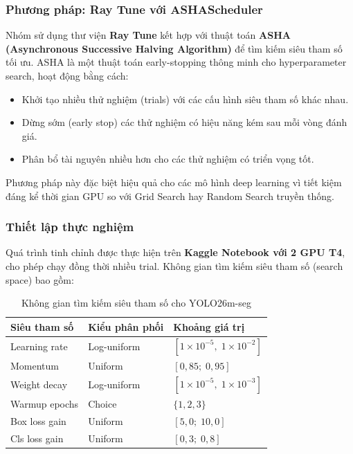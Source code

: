 \subsubsection{Phương pháp: Ray Tune với ASHAScheduler}

Nhóm sử dụng thư viện \textbf{Ray Tune} kết hợp với thuật toán \textbf{ASHA (Asynchronous Successive Halving Algorithm)} để tìm kiếm siêu tham số tối ưu. ASHA là một thuật toán early-stopping thông minh cho hyperparameter search, hoạt động bằng cách:
\begin{itemize}
    \item Khởi tạo nhiều thử nghiệm (trials) với các cấu hình siêu tham số khác nhau.
    \item Dừng sớm (early stop) các thử nghiệm có hiệu năng kém sau mỗi vòng đánh giá.
    \item Phân bổ tài nguyên nhiều hơn cho các thử nghiệm có triển vọng tốt.
\end{itemize}

Phương pháp này đặc biệt hiệu quả cho các mô hình deep learning vì tiết kiệm đáng kể thời gian GPU so với Grid Search hay Random Search truyền thống.

\subsubsection{Thiết lập thực nghiệm}

Quá trình tinh chỉnh được thực hiện trên \textbf{Kaggle Notebook với 2 GPU T4}, cho phép chạy đồng thời nhiều trial. Không gian tìm kiếm siêu tham số (search space) bao gồm:

\begin{table}[H]
    \caption{Không gian tìm kiếm siêu tham số cho YOLO26m-seg}
    \centering
    \begin{tabular}{lll}
        \toprule
        \textbf{Siêu tham số} & \textbf{Kiểu phân phối} & \textbf{Khoảng giá trị}                  \\
        \midrule
        Learning rate         & Log-uniform             & $[1 \times 10^{-5},\; 1 \times 10^{-2}]$ \\
        Momentum              & Uniform                 & $[0,85;\; 0,95]$                         \\
        Weight decay          & Log-uniform             & $[1 \times 10^{-5},\; 1 \times 10^{-3}]$ \\
        Warmup epochs         & Choice                  & $\{1, 2, 3\}$                            \\
        Box loss gain         & Uniform                 & $[5,0;\; 10,0]$                          \\
        Cls loss gain         & Uniform                 & $[0,3;\; 0,8]$                           \\
        \bottomrule
    \end{tabular}
    \label{tab:hpo_search_space}
\end{table}

